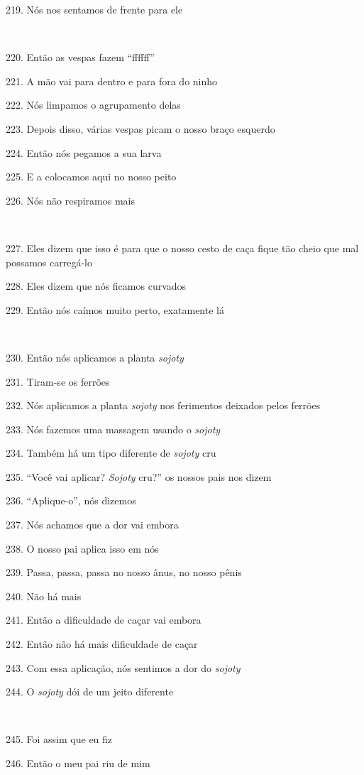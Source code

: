 219. Nós nos sentamos de frente para ele

~

220. Então as vespas fazem ``ffffff''

221. A mão vai para dentro e para fora do ninho

222. Nós limpamos o agrupamento delas

223. Depois disso, várias vespas picam o nosso braço esquerdo

224. Então nós pegamos a sua larva

225. E a colocamos aqui no nosso peito

226. Nós não respiramos mais

~

227. Eles dizem que isso é para que o nosso cesto de caça fique tão cheio
que mal possamos carregá-lo

228. Eles dizem que nós ficamos curvados

229. Então nós caímos muito perto, exatamente lá

~

230. Então nós aplicamos a planta \emph{sojoty}

231. Tiram-se os ferrões

232. Nós aplicamos a planta \emph{sojoty} nos ferimentos deixados pelos
ferrões

233. Nós fazemos uma massagem usando o \emph{sojoty}

234. Também há um tipo diferente de \emph{sojoty} cru

235. ``Você vai aplicar? \emph{Sojoty} cru?'' os nossos pais nos dizem

236. ``Aplique-o'', nós dizemos

237. Nós achamos que a dor vai embora

238. O nosso pai aplica isso em nós

239. Passa, passa, passa no nosso ânus, no nosso pênis

240. Não há mais

241. Então a dificuldade de caçar vai embora

242. Então não há mais dificuldade de caçar

243. Com essa aplicação, nós sentimos a dor do \emph{sojoty}

244. O \emph{sojoty} dói de um jeito diferente

~

245. Foi assim que eu fiz

246. Então o meu pai riu de mim

